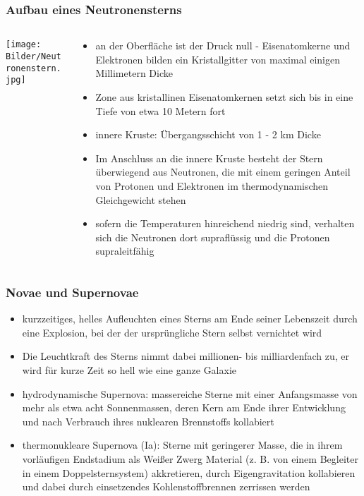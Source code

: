 \documentclass{beamer}
\begin{document}
\begin{frame}\frametitle{Aufbau eines Neutronensterns}

\begin{columns}

\begin{column}{.48\textwidth}

\texttt{[image: Bilder/Neutronenstern.jpg]}

\end{column}

\hfill

\begin{column}{.48\textwidth}

\tiny

\begin{itemize}
\item an der Oberfläche ist der Druck null
- Eisenatomkerne und Elektronen bilden ein Kristallgitter von maximal einigen Millimetern Dicke
\item Zone aus kristallinen Eisenatomkernen setzt sich bis in eine Tiefe von etwa 10 Metern fort
\item innere Kruste: Übergangsschicht von 1 - 2 km Dicke
\item Im Anschluss an die innere Kruste besteht der Stern überwiegend aus Neutronen, die mit einem geringen Anteil von Protonen und Elektronen im thermodynamischen Gleichgewicht stehen
\item sofern die Temperaturen hinreichend niedrig sind, verhalten sich die Neutronen dort supraflüssig und die Protonen supraleitfähig
\end{itemize}

\end{column}

\end{columns}

\end{frame}

\begin{frame}\frametitle{Novae und Supernovae}

\begin{itemize}
\item kurzzeitiges, helles Aufleuchten eines Sterns am Ende seiner Lebenszeit durch eine Explosion, bei der der ursprüngliche Stern selbst vernichtet wird
\item Die Leuchtkraft des Sterns nimmt dabei millionen- bis milliardenfach zu, er wird für kurze Zeit so hell wie eine ganze Galaxie
\item hydrodynamische Supernova: massereiche Sterne mit einer Anfangsmasse von mehr als etwa acht Sonnenmassen, deren Kern am Ende ihrer Entwicklung und nach Verbrauch ihres nuklearen Brennstoffs kollabiert
\item thermonukleare Supernova (Ia): Sterne mit geringerer Masse, die in ihrem vorläufigen Endstadium als Weißer Zwerg Material (z. B. von einem Begleiter in einem Doppelsternsystem) akkretieren, durch Eigengravitation kollabieren und dabei durch einsetzendes Kohlenstoffbrennen zerrissen werden
\end{itemize}

\end{frame}
\end{document}
